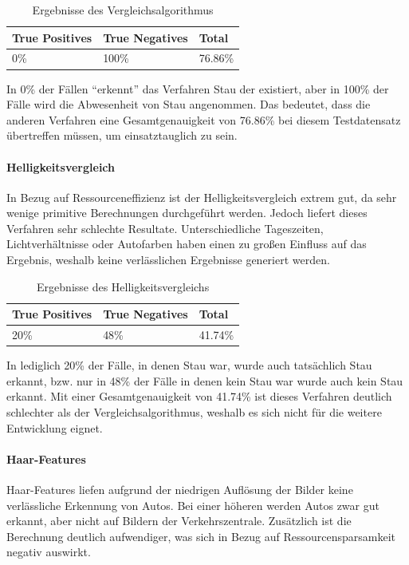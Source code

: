 \begin{table}[ht]
  \centering
\scriptsize
    \begin{tabular}{ | l | l | l |}
    \hline
		True Positives & True Negatives & Total \\ \hline
    0\% &
		100\% &
		76.86\% \\
    \hline
    \end{tabular}
		\caption{Ergebnisse des Vergleichsalgorithmus}
\end{table}

In 0\% der Fällen "`erkennt"' das Verfahren Stau der existiert, aber in 100\% der Fälle wird die Abwesenheit von Stau angenommen. Das bedeutet, dass die anderen Verfahren eine Gesamtgenauigkeit von 76.86\% bei diesem Testdatensatz übertreffen müssen, um einsatztauglich zu sein.

\paragraph{Helligkeitsvergleich}
In Bezug auf Ressourceneffizienz ist der Helligkeitsvergleich extrem gut, da sehr wenige primitive Berechnungen durchgeführt werden.
Jedoch liefert dieses Verfahren sehr schlechte Resultate. Unterschiedliche Tageszeiten, Lichtverhältnisse oder Autofarben haben einen zu großen Einfluss auf das Ergebnis, weshalb keine verlässlichen Ergebnisse generiert werden.

\begin{table}[ht]
  \centering
\scriptsize
    \begin{tabular}{ | l | l | l |}
    \hline
		True Positives & True Negatives & Total \\ \hline
    20\% &
		48\% &
		41.74\% \\
    \hline
    \end{tabular}
  \caption{Ergebnisse des Helligkeitsvergleichs}
\end{table}

In lediglich 20\% der Fälle, in denen Stau war, wurde auch tatsächlich Stau erkannt, bzw. nur in 48\% der Fälle in denen kein Stau war wurde auch kein Stau erkannt.
Mit einer Gesamtgenauigkeit von 41.74\% ist dieses Verfahren deutlich schlechter als der Vergleichsalgorithmus, weshalb es sich nicht für die weitere Entwicklung eignet.

\paragraph{Haar-Features}
Haar-Features liefen aufgrund der niedrigen Auflösung der Bilder keine verlässliche Erkennung von Autos. Bei einer höheren werden Autos zwar gut erkannt, aber nicht auf Bildern der Verkehrszentrale. Zusätzlich ist die Berechnung deutlich aufwendiger, was sich in Bezug auf Ressourcensparsamkeit negativ auswirkt.

